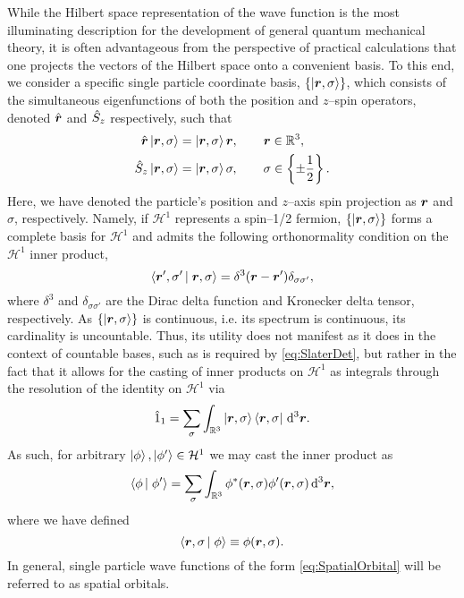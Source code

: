 While the Hilbert space representation of the wave function is the most illuminating description for the development of
general quantum mechanical theory, it is often advantageous from the perspective of practical calculations that one
projects the vectors of the Hilbert space onto a convenient basis. 
To this end, we consider a specific single particle coordinate basis, $\left \lbrace \left\vert \boldsymbol{r},\sigma \right\rangle \right\rbrace$, 
which consists of the simultaneous eigenfunctions
of both the position and $z$--spin operators, denoted $\hat{\boldsymbol{r}}$ and $\hat{S}_z$ respectively,
such that
\begin{subequations}
\begin{align}
  \hat{\boldsymbol{r}}\left\vert \boldsymbol{r},\sigma \right\rangle &= \left\vert \boldsymbol{r},\sigma \right\rangle\boldsymbol{r}, \qquad \boldsymbol{r}\in\mathbb{R}^3, \\
  \hat{S}_z\left\vert \boldsymbol{r},\sigma \right\rangle    &= \left\vert \boldsymbol{r},\sigma \right\rangle\sigma, \qquad \sigma \in \left \lbrace \pm\frac{1}{2} \right\rbrace.
\end{align}
\end{subequations}
Here, we have denoted the particle's position and $z$--axis spin projection as $\boldsymbol{r}$ and $\sigma$, respectively.
Namely, if $\mathcal{H}^1$ represents a spin--1/2 fermion, $\left \lbrace \left\vert \boldsymbol{r},\sigma \right\rangle \right\rbrace$ forms a complete basis for $\mathcal{H}^1$ 
and admits the following orthonormality  condition on the $\mathcal{H}^1$ inner product,
\begin{equation}
  \label{eq:SpatialInner}
  \left\langle \boldsymbol{r}',\sigma' \left\vert\right. \boldsymbol{r},\sigma \right\rangle = \delta^3(\boldsymbol{r} - \boldsymbol{r}')\delta_{\sigma\sigma'},
\end{equation}
where $\delta^3$ and $\delta_{\sigma\sigma'}$ are the Dirac delta function and Kronecker delta tensor, respectively.
As $\left \lbrace \left\vert \boldsymbol{r},\sigma \right\rangle \right\rbrace$ is continuous, i.e. its spectrum is continuous, its cardinality is uncountable. Thus,
its utility does not manifest as it does in the context of countable bases, such as is required by \cref{eq:SlaterDet},
but rather in the fact that it allows for the casting of inner products on $\mathcal{H}^1$ as integrals through the resolution
of the identity on $\mathcal{H}^1$ via
\begin{equation}
  \label{eq:H1Identity}
  \hat{1}_1 = \sum_\sigma \int_{\mathbb R ^3} \left\vert \boldsymbol{r},\sigma \right\rangle\left\langle \boldsymbol{r},\sigma \right\vert \,\mathrm{d}^3\boldsymbol{r}.
\end{equation}
As such, for arbitrary $\left\vert \phi \right\rangle,\left\vert \phi' \right\rangle\in\mathcal{H}^1$ we may cast the inner product as
\begin{equation}
\left\langle \phi \left\vert\right. \phi' \right\rangle = \sum_\sigma \int_{\mathbb R ^3} \phi^*(\boldsymbol{r},\sigma) \phi'(\boldsymbol{r},\sigma) \,\mathrm{d}^3\boldsymbol{r},
\end{equation}
where we have defined
\begin{equation}
  \label{eq:SpatialOrbital}
  \left\langle \boldsymbol{r},\sigma \left\vert\right. \phi \right\rangle \equiv \phi(\boldsymbol{r},\sigma).
\end{equation}
In general, single particle wave functions of the form \cref{eq:SpatialOrbital} will be referred to as spatial orbitals.

